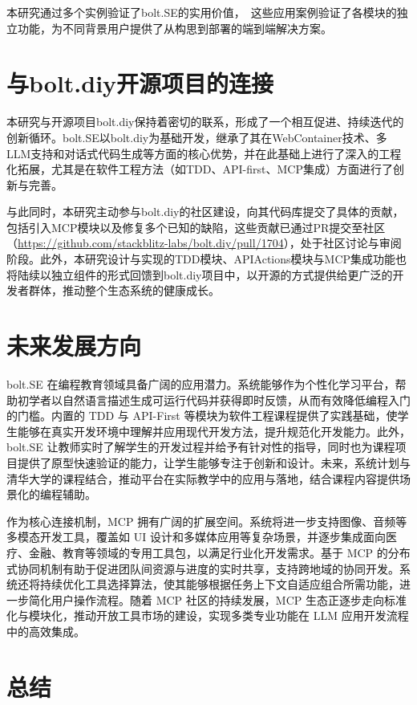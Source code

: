 本研究通过多个实例验证了bolt.SE的实用价值，　这些应用案例验证了各模块的独立功能，为不同背景用户提供了从构思到部署的端到端解决方案。

\section{与bolt.diy开源项目的连接}

本研究与开源项目bolt.diy保持着密切的联系，形成了一个相互促进、持续迭代的创新循环。bolt.SE以bolt.diy为基础开发，继承了其在WebContainer技术、多LLM支持和对话式代码生成等方面的核心优势，并在此基础上进行了深入的工程化拓展，尤其是在软件工程方法（如TDD、API-first、MCP集成）方面进行了创新与完善。

与此同时，本研究主动参与bolt.diy的社区建设，向其代码库提交了具体的贡献，包括引入MCP模块以及修复多个已知的缺陷，这些贡献已通过PR提交至社区（\href{https://github.com/stackblitz-labs/bolt.diy/pull/1704}{https://github.com/stackblitz-labs/bolt.diy/pull/1704}），处于社区讨论与审阅阶段。此外，本研究设计与实现的TDD模块、APIActions模块与MCP集成功能也将陆续以独立组件的形式回馈到bolt.diy项目中，以开源的方式提供给更广泛的开发者群体，推动整个生态系统的健康成长。

\section{未来发展方向}

bolt.SE 在编程教育领域具备广阔的应用潜力。系统能够作为个性化学习平台，帮助初学者以自然语言描述生成可运行代码并获得即时反馈，从而有效降低编程入门的门槛。内置的 TDD 与 API-First 等模块为软件工程课程提供了实践基础，使学生能够在真实开发环境中理解并应用现代开发方法，提升规范化开发能力。此外，bolt.SE 让教师实时了解学生的开发过程并给予有针对性的指导，同时也为课程项目提供了原型快速验证的能力，让学生能够专注于创新和设计。未来，系统计划与清华大学的课程结合，推动平台在实际教学中的应用与落地，结合课程内容提供场景化的编程辅助。

作为核心连接机制，MCP 拥有广阔的扩展空间。系统将进一步支持图像、音频等多模态开发工具，覆盖如 UI 设计和多媒体应用等复杂场景，并逐步集成面向医疗、金融、教育等领域的专用工具包，以满足行业化开发需求。基于 MCP 的分布式协同机制有助于促进团队间资源与进度的实时共享，支持跨地域的协同开发。系统还将持续优化工具选择算法，使其能够根据任务上下文自适应组合所需功能，进一步简化用户操作流程。随着 MCP 社区的持续发展，MCP 生态正逐步走向标准化与模块化，推动开放工具市场的建设，实现多类专业功能在 LLM 应用开发流程中的高效集成。

\section{总结}

